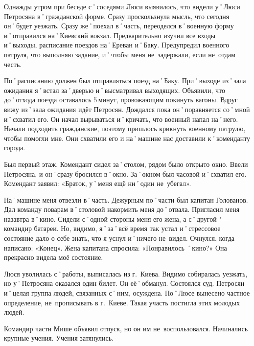 Однажды утром при беседе с˚соседями Люси выявилось, что видели у˚Люси Петросяна в˚гражданской форме. Сразу проскользнула мысль, что сегодня он˚будет уезжать. Сразу же˚поехал в˚часть, переоделся в˚военную форму и˚отправился на˚Киевский вокзал. Предварительно изучил все входы и˚выходы, расписание поездов на˚Ереван и˚Баку. Предупредил военного патруля, что выполняю задание, и˚чтобы меня не~задержали, если не~отдам честь. 

По˚расписанию должен был отправляться поезд на˚Баку. При˚выходе из˚зала ожидания я˚встал за˚дверью и˚высматривал выходящих. Объявили, что до˚отхода поезда оставалось 5\,минут, провожающим покинуть вагоны. Вдруг вижу из˚зала ожидания идёт Петросян. Дождался пока он˚поравняется со˚мной и˚схватил его. Он начал вырываться и˚кричать, что военный напал на˚него. Начали подходить гражданские, поэтому пришлось крикнуть военному патрулю, чтобы помогли мне. Они схватили его и на˚машине нас доставили к˚коменданту города. 

Был первый этаж. Комендант сидел за˚столом, рядом было открыто окно. Ввели Петросяна, и он˚сразу бросился в˚окно. За˚окном был часовой и˚схватил его. Комендант заявил: «Браток, у˚меня ещё ни˚один не~убегал». 

На˚машине меня отвезли в˚часть. Дежурным по˚части был капитан Голованов. Дал команду поварам в˚столовой накормить меня до˚отвала. Пригласил меня назавтра в˚кино. Сидели с˚одной стороны меня его жена, а с˚другой "--- командир батареи. Но, видимо, я˚за˚всё время так устал и˚стрессовое состояние дало о себе знать, что я уснул и˚ничего не~видел. Очнулся, когда написано: «Конец». Жена капитана спросила: «Понравилось ˚кино?» Она прекрасно видела моё состояние. 

Люся уволилась с˚работы, выписалась из г.~Киева. Видимо собиралась уезжать, но у˚Петросяна оказался один билет. Он её˚обманул. Состоялся суд. Петросян и˚целая группа людей, связанных с˚ним, осуждена. По˚Люсе вынесено частное определение, не~прописывать в г.~Киеве. Такая участь постигла этих молодых людей.

Командир части Мише объявил отпуск, но он им не~воспользовался. Начинались крупные учения. Учения затянулись.


